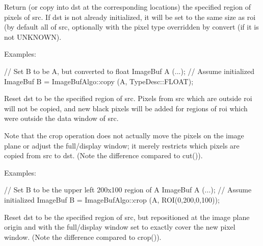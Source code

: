 

Return (or copy into {\cf dst} at the corresponding locations) the specified
region of pixels of {\cf src}.  If {\cf dst} is not already initialized, it
will be set to the same size as {\cf roi} (by default all of {\cf src},
optionally with the pixel type overridden by {\cf convert} (if it is not
{\cf UNKNOWN}).

\smallskip
\noindent Examples:
\begin{code}
    // Set B to be A, but converted to float
    ImageBuf A (...);  // Assume initialized
    ImageBuf B = ImageBufAlgo::copy (A, TypeDesc::FLOAT);
\end{code}
\apiend


 
Reset {\cf dst} to be the specified region of {\cf src}.
Pixels from {\cf src} which are outside {\cf roi} will not be copied, and
new black pixels will be added for regions of {\cf roi} which were outside
the data window of {\cf src}.

Note that the {\cf crop} operation does not actually move the pixels on the
image plane or adjust the full/display window; it merely restricts which
pixels are copied from {\cf src} to {\cf dst}.  (Note the difference
compared to {\cf cut()}).

\smallskip
\noindent Examples:
\begin{code}
    // Set B to be the upper left 200x100 region of A
    ImageBuf A (...);  // Assume initialized
    ImageBuf B = ImageBufAlgo::crop (A, ROI(0,200,0,100));
\end{code}
\apiend


 
Reset {\cf dst} to be the specified region of {\cf src}, but repositioned at
the image plane origin and with the full/display window set to exactly cover
the new pixel window.  (Note the difference compared to {\cf crop()}).

